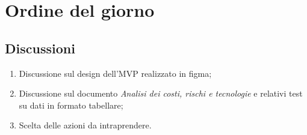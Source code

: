 \section{Ordine del giorno} \label{sec:agenda}
\subsection{Discussioni} \label{subsec:discussione}
\begin{enumerate}

    \item Discussione sul design dell'MVP realizzato in figma;
    \item Discussione sul documento \textit{Analisi dei costi, rischi e tecnologie} e relativi test su dati in formato tabellare;
    \item Scelta delle azioni da intraprendere.
\end{enumerate}

